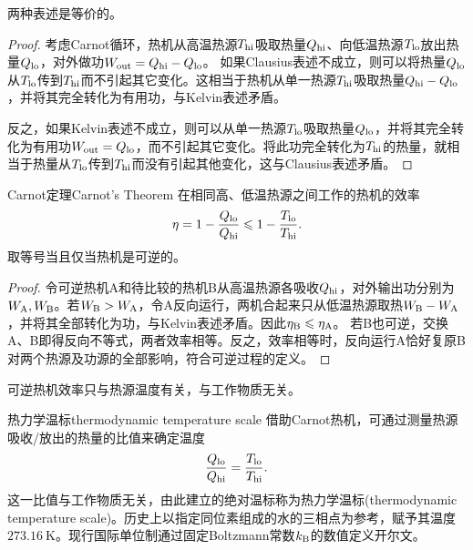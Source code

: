 \begin{corollary}
	两种表述是等价的。
\end{corollary}

\begin{proof}
	考虑Carnot循环，热机从高温热源$T_\hi$吸取热量$Q_\hi$、向低温热源$T_\lo$放出热量$Q_\lo$，对外做功$W_{\rm out} = Q_\hi - Q_\lo$。
	如果Clausius表述不成立，则可以将热量$Q_\lo$从$T_\lo$传到$T_\hi$而不引起其它变化。这相当于热机从单一热源$T_\hi$吸取热量$Q_\hi - Q_\lo$，并将其完全转化为有用功，与Kelvin表述矛盾。

	反之，如果Kelvin表述不成立，则可以从单一热源$T_\lo$吸取热量$Q_\lo$，并将其完全转化为有用功$W_{\rm out} = Q_\lo$，而不引起其它变化。将此功完全转化为$T_\hi$的热量，就相当于热量从$T_\lo$传到$T_\hi$而没有引起其他变化，这与Clausius表述矛盾。
\end{proof}

\begin{theorem}{Carnot定理}{Carnot's Theorem}
	在相同高、低温热源之间工作的热机的效率
	\begin{equation}
		\eta = 1 - \frac{Q_\lo}{Q_\hi} \leq 1 - \frac{T_\lo}{T_\hi}.
	\end{equation}
	取等号当且仅当热机是可逆的。
\end{theorem}

\begin{proof}
	令可逆热机A和待比较的热机B从高温热源各吸收$Q_\hi$，对外输出功分别为$W_{\rm A},W_{\rm B}$。若$W_{\rm B} > W_{\rm A}$，令A反向运行，两机合起来只从低温热源取热$W_{\rm B} - W_{\rm A}$，并将其全部转化为功，与Kelvin表述矛盾。因此$\eta_{\rm B} \leq \eta_{\rm A}$。
	若B也可逆，交换A、B即得反向不等式，两者效率相等。反之，效率相等时，反向运行A恰好复原B对两个热源及功源的全部影响，符合可逆过程的定义。
\end{proof}

\begin{corollary}
	可逆热机效率只与热源温度有关，与工作物质无关。
\end{corollary}

\begin{definition}
	{热力学温标}{thermodynamic temperature scale}
	借助Carnot热机，可通过测量热源吸收/放出的热量的比值来确定温度
	\begin{equation}
		\label{eq:sm-absolute-temperature-ratio}
		\frac{Q_\lo}{Q_\hi} = \frac{T_\lo}{T_\hi}.
	\end{equation}
	这一比值与工作物质无关，由此建立的绝对温标称为热力学温标(thermodynamic temperature scale)。历史上以指定同位素组成的水的三相点为参考，赋予其温度$\qty{273.16}{\kelvin}$。现行国际单位制通过固定Boltzmann常数$\kB$的数值定义开尔文。
\end{definition}

